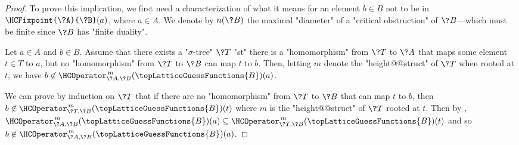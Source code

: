 \begin{proof}
	To prove this implication, we first need a characterization of
	what it means for an element $b\in B$ not to be in $\HCFixpoint{\?A}{\?B}(a)$,
	where $a\in A$.
	We denote by $n(\?B)$ the maximal "diameter" of a "critical obstruction" of $\?B$---which
	must be finite since $\?B$ has "finite duality".
	\begin{claim}
		\AP\label{claim:hyperedge-consistency-uniform-convergence-tree-witnesses}
		Let $a\in A$ and $b\in B$. Assume that there exists a "$\sigma$-tree" $\?T$ "st" there is a "homomorphism" from $\?T$ to $\?A$ that maps some element $t \in T$ to $a$, but no "homomorphism" from $\?T$ to $\?B$
		can map $t$ to $b$. Then, letting $m$ denote the "height@@struct" of $\?T$ when rooted
		at $t$, we have $b \not\in \HCOperator^{\,m}_{\?A,\?B}(\topLatticeGuessFunctions{B})(a)$.
	\end{claim}
	We can prove by induction on $\?T$ that if there are no "homomorphism" from $\?T$ to $\?B$
	that can map $t$ to $b$, then $b \not\in \HCOperator^{\,m}_{\?T,\?B}(\topLatticeGuessFunctions{B})(t)$ where $m$ is the "height@@struct" of $\?T$ rooted at $t$.
	Then by , 
	$\HCOperator^{\,m}_{\?A,\?B}(\topLatticeGuessFunctions{B})(a) \subseteq
	\HCOperator^{\,m}_{\?T,\?B}(\topLatticeGuessFunctions{B})(t)$ and so
	$b \not\in \HCOperator^{\,m}_{\?A,\?B}(\topLatticeGuessFunctions{B})(a)$.


\end{proof}
